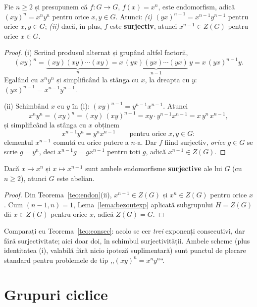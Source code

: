 \begin{teorema}\label{teo:endon}
Fie $n\ge2$ și presupunem că $f:G\to G$, $f(x)=x^n$, este endomorfism, adică $(xy)^n=x^ny^n$ pentru orice $x,y\in G$. Atunci:
\emph{(i)} $(yx)^{n-1}=x^{n-1}y^{n-1}$ pentru orice $x,y\in G$;
\emph{(ii)} dacă, în plus, $f$ este \textbf{surjectiv}, atunci $x^{n-1}\in Z(G)$ pentru orice $x\in G$.
\end{teorema}

\begin{proof}
(i) Scriind produsul alternat și grupând altfel factorii,
\[
(xy)^n=\underbrace{(xy)(xy)\cdots(xy)}_{n}=x\,\underbrace{(yx)(yx)\cdots(yx)}_{n-1}\,y=x\,(yx)^{n-1}y.
\]
Egalând cu $x^ny^n$ și simplificând la stânga cu $x$, la dreapta cu $y$: $(yx)^{n-1}=x^{n-1}y^{n-1}$.

(ii) Schimbând $x$ cu $y$ în (i): $(xy)^{n-1}=y^{n-1}x^{n-1}$. Atunci
\[
x^ny^n=(xy)^n=(xy)\,(xy)^{n-1}=xy\cdot y^{n-1}x^{n-1}=x\,y^n\,x^{n-1},
\]
și simplificând la stânga cu $x$ obținem
\[
x^{n-1}y^n=y^nx^{n-1}\qquad\text{pentru orice }x,y\in G:
\]
elementul $x^{n-1}$ comută cu orice putere a $n$-a. Dar $f$ fiind surjectiv, \emph{orice} $g\in G$ se scrie $g=y^n$, deci $x^{n-1}g=gx^{n-1}$ pentru toți $g$, adică $x^{n-1}\in Z(G)$.
\end{proof}

\begin{corolar}\label{cor:nn1}
Dacă $x\mapsto x^n$ și $x\mapsto x^{n+1}$ sunt ambele endomorfisme \textbf{surjective} ale lui $G$ (cu $n\ge2$), atunci $G$ este abelian.
\end{corolar}

\begin{proof}
Din Teorema~\ref{teo:endon}(ii), $x^{n-1}\in Z(G)$ și $x^{n}\in Z(G)$ pentru orice $x$. Cum $(n-1,n)=1$, Lema~\ref{lema:bezoutexp} aplicată subgrupului $H=Z(G)$ dă $x\in Z(G)$ pentru orice $x$, adică $Z(G)=G$.
\end{proof}

\begin{observatie}
Comparați cu Teorema~\ref{teo:consec}: acolo se cer \emph{trei} exponenți consecutivi, dar fără surjectivitate; aici doar doi, în schimbul surjectivității. Ambele scheme (plus identitatea (i), valabilă fără nicio ipoteză suplimentară) sunt punctul de plecare standard pentru problemele de tip ,,$(xy)^n=x^ny^n$``.
\end{observatie}

\section{Grupuri ciclice}

